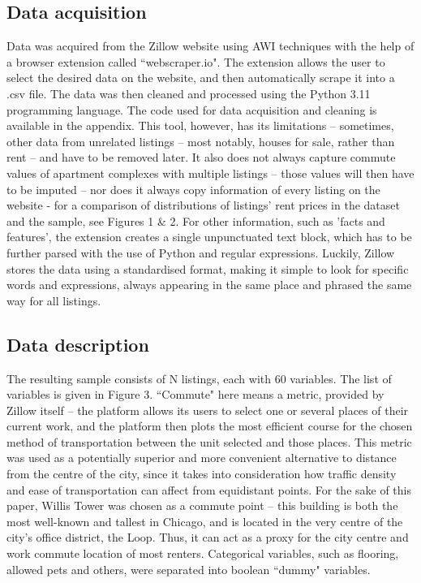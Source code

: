 \documentclass[12pt]{report}
\begin{document}
\subsection{Data acquisition}
Data was acquired from the Zillow website using AWI techniques with the help of a browser extension called ``webscraper.io". The extension allows the user to select the desired data on the website, and then automatically scrape it into a .csv file. The data was then cleaned and processed using the Python 3.11 programming language. The code used for data acquisition and cleaning is available in the appendix. This tool, however, has its limitations -- sometimes, other data from unrelated listings -- most notably, houses for sale, rather than rent -- and have to be removed later. It also does not always capture commute values of apartment complexes with multiple listings -- those values will then have to be imputed -- nor does it always copy information of every listing on the website - for a comparison of distributions of listings' rent prices in the dataset and the sample, see Figures 1 \& 2. For other information, such as 'facts and features', the extension creates a single unpunctuated text block, which has to be further parsed with the use of Python and regular expressions. Luckily, Zillow stores the data using a standardised format, making it simple to look for specific words and expressions, always appearing in the same place and phrased the same way for all listings.

\subsection{Data description}

The resulting sample consists of N listings, each with 60 variables. The list of variables is given in Figure 3. ``Commute" here means a metric, provided by Zillow itself -- the platform allows its users to select one or several places of their current work, and the platform then plots the most efficient course for the chosen method of transportation between the unit selected and those places. This metric was used as a potentially superior and more convenient alternative to distance from the centre of the city, since it takes into consideration how traffic density and ease of transportation can affect from equidistant points. For the sake of this paper, Willis Tower was chosen as a commute point -- this building is both the most well-known and tallest in Chicago, and is located in the very centre of the city's office district, the Loop. Thus, it can act as a proxy for the city centre and work commute location of most renters. Categorical variables, such as flooring, allowed pets and others, were separated into boolean ``dummy" variables.
\end{document}
